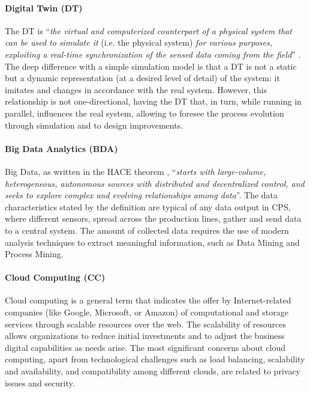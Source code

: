\paragraph{Digital Twin (DT)}
The DT is “\textit{the virtual and computerized counterpart of a physical system that can be used to simulate it} (i.e. the physical system) \textit{for various purposes, exploiting a real-time synchronization of the sensed data coming from the field}” \cite{NegriElisa2017ARot}. The deep difference with a simple simulation model is that a DT is not a static but a dynamic representation (at a desired level of detail) of the system: it imitates and changes in accordance with the real system. However, this relationship is not one-directional, having the DT that, in turn, while running in parallel, influences the real system, allowing to foresee the process evolution through simulation and to design improvements. 
\paragraph{Big Data Analytics (BDA)}
Big Data, as written in the HACE theorem \cite{XindongWu2014Dmwb}, “\textit{starts with large-volume, heterogeneous, autonomous sources with distributed and decentralized control, and seeks to explore complex and evolving relationships among data}”. The data characteristics stated by the definition are typical of any data output in CPS, where different sensors, spread across the production lines, gather and send data to a central system. The amount of collected data requires the use of modern analysis techniques to extract meaningful information, such as Data Mining and Process Mining. 
\paragraph{Cloud Computing (CC)}
Cloud computing is a general term that indicates the offer by Internet-related companies (like Google, Microsoft, or Amazon) of computational and storage services through scalable resources over the web. The scalability of resources allows organizations to reduce initial investments and to adjust the business digital capabilities as needs arise. The most significant concerns about cloud computing, apart from technological challenges such as load balancing, scalability and availability, and compatibility among different clouds, are related to privacy issues and security. 
